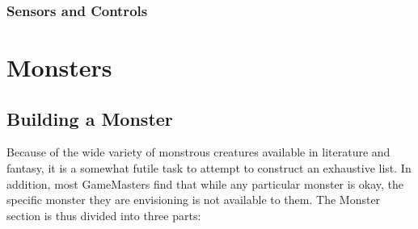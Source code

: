 \documentclass[twoside]{book}
\begin{document}
    

\subsection{Sensors and Controls}
    
    

\chapter{Monsters}
    
    

\section{Building a Monster}
     Because of the wide variety of monstrous creatures
             available in literature and fantasy, it is a somewhat futile
             task to attempt to construct an exhaustive list. In
             addition, most GameMasters find that while any particular
             monster is okay, the specific monster they are envisioning
             is not available to them. The Monster section is thus
             divided into three parts: 
\begin{description}
    
  \item[] 
  \item[] 
  \item[] 
\end{description}
  
    
\end{document}
